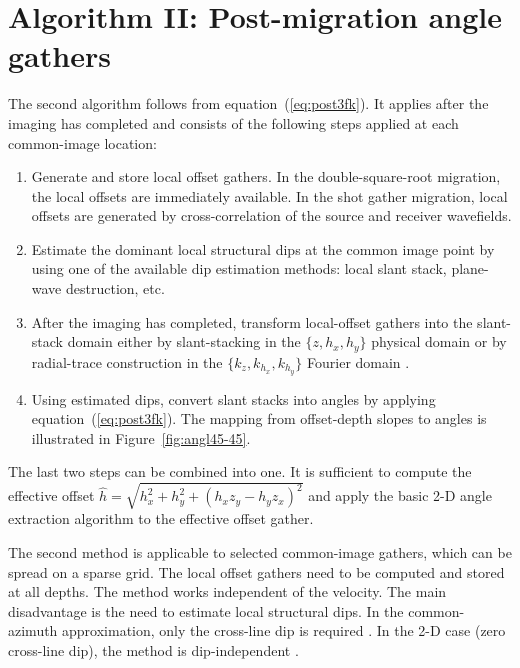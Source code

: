 \section{Algorithm II: Post-migration angle gathers}

The second algorithm follows from equation~(\ref{eq:post3fk}). It applies
after the imaging has completed and consists of the following steps applied at
each common-image location:
\begin{enumerate}
\item Generate and store local offset gathers.  In the double-square-root
  migration, the local offsets are immediately available.  In the shot gather
  migration, local offsets are generated by cross-correlation of the source
  and receiver wavefields.
\item Estimate the dominant local structural dips at the common image point by
  using one of the available dip estimation methods: local slant stack,
  plane-wave destruction, etc.
\item After the imaging has completed, transform local-offset gathers into the
  slant-stack domain either by slant-stacking in the $\{z,h_x,h_y\}$ physical
  domain or by radial-trace construction in the $\{k_z,k_{h_x},k_{h_y}\}$
  Fourier domain \cite[]{GEO68-03-10651074}.
\item Using estimated dips, convert slant stacks into angles by applying
  equation~(\ref{eq:post3fk}). The mapping from offset-depth slopes to angles
  is illustrated in Figure~\ref{fig:angl45-45}.
\end{enumerate}
The last two steps can be combined into one. It is sufficient to compute the
effective offset $\hat{h} = \sqrt{h_x^2+h_y^2+(h_x z_y - h_y z_x)^2}$ and
apply the basic 2-D angle extraction algorithm to the effective offset gather.


The second method is applicable to selected common-image gathers, which can be
spread on a sparse grid. The local offset gathers need to be computed and
stored at all depths. The method works independent of the velocity. The main
disadvantage is the need to estimate local structural dips. In the
common-azimuth approximation, only the cross-line dip is required
\cite[]{newseg}. In the 2-D case (zero cross-line dip), the method is
dip-independent \cite[]{GEO68-03-10651074}.

